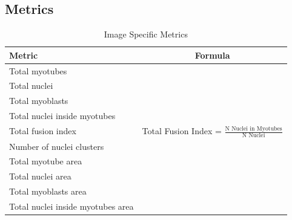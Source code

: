 \subsection{Metrics}\label{secmetrics}
\begin{table}[H]
	\centering
	\caption{Image Specific Metrics}
	\begin{tabular}{|l|c|}
		\hline
		Metric & Formula \\
		\hline
		Total myotubes &  \\
		\hline
		Total nuclei &  \\
		\hline
		Total myoblasts &  \\
		\hline
		Total nuclei inside myotubes &  \\
		\hline
		Total fusion index & Total Fusion Index = $\frac{\text{N Nuclei in Myotubes}}{\text{N Nuclei}}$ \\
		\hline
		Number of nuclei clusters &  \\
		\hline
		Total myotube area &  \\
		\hline
		Total nuclei area &  \\
		\hline
		Total myoblasts area &  \\
		\hline
		Total nuclei inside myotubes area &  \\
		\hline
	\end{tabular}
	\label{tabimgspec}
\end{table}

